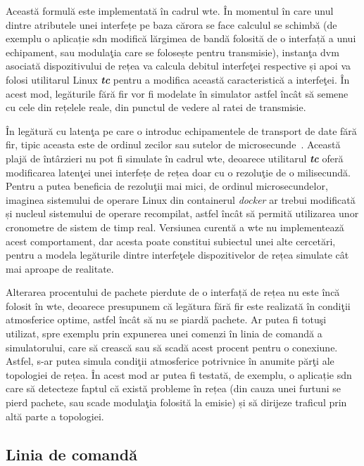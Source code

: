 Această formulă este implementată în cadrul \gls{wte}. În momentul în care unul dintre atributele unei interfețe pe baza cărora se face calculul se schimbă (de exemplu o aplicație \gls{sdn} modifică lărgimea de bandă folosită de o interfață a unui echipament, sau modulaţia care se folosește pentru transmisie), instanţa \gls{dvm} asociată dispozitivului de rețea va calcula debitul interfeţei respective și apoi va folosi utilitarul Linux \textit{\textbf{tc}} pentru a modifica această caracteristică a interfeţei. În acest mod, legăturile fără fir vor fi modelate în simulator astfel încât să semene cu cele din rețelele reale, din punctul de vedere al ratei de transmisie.

În legătură cu latenţa pe care o introduc echipamentele de transport de date fără fir, tipic aceasta este de ordinul zecilor sau sutelor de microsecunde~\cite{kizer2013digital}. Această plajă de întârzieri nu pot fi simulate în cadrul \gls{wte}, deoarece utilitarul \textit{\textbf{tc}} oferă modificarea latenţei unei interfețe de rețea doar cu o rezoluţie de o milisecundă. Pentru a putea beneficia de rezoluţii mai mici, de ordinul microsecundelor, imaginea sistemului de operare Linux din containerul \textit{docker} ar trebui modificată și nucleul sistemului de operare recompilat, astfel încât să permită utilizarea unor cronometre de sistem de timp real. Versiunea curentă a \gls{wte} nu implementează acest comportament, dar acesta poate constitui subiectul unei alte cercetări, pentru a modela legăturile dintre interfeţele dispozitivelor de rețea simulate cât mai aproape de realitate.

Alterarea procentului de pachete pierdute de o interfață de rețea nu este încă folosit în \gls{wte}, deoarece presupunem că legătura fără fir este realizată în condiţii atmosferice optime, astfel încât să nu se piardă pachete. Ar putea fi totuşi utilizat, spre exemplu prin expunerea unei comenzi în linia de comandă a simulatorului, care să crească sau să scadă acest procent pentru o conexiune. Astfel, s-ar putea simula condiţii atmosferice potrivnice în anumite părţi ale topologiei de rețea. În acest mod ar putea fi testată, de exemplu, o aplicație \gls{sdn} care să detecteze faptul că există probleme în rețea (din cauza unei furtuni se pierd pachete, sau scade modulaţia folosită la emisie) și să dirijeze traficul prin altă parte a topologiei.

\subsection{Linia de comandă}

